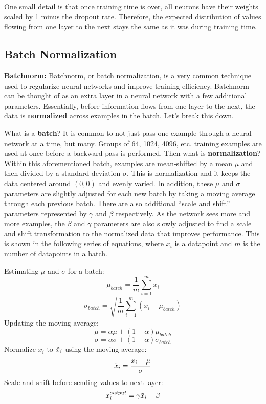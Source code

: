 \begin{flushleft}
    One small detail is that once training time is over, all neurons have their weights scaled by 1 minus the dropout rate. Therefore, the expected distribution of values flowing from one layer to the next stays the same as it was during training time.
\end{flushleft}

\subsection{Batch Normalization}
\begin{flushleft}
    \large \textbf{Batchnorm:} Batchnorm, or batch normalization, is a very common technique used to regularize neural networks and improve training efficiency. Batchnorm can be thought of as an extra layer in a neural network with a few additional parameters. Essentially, before information flows from one layer to the next, the data is \textbf{normalized} across examples in the batch. Let's break this down. \break
    
    What is a \textbf{batch}? It is common to not just pass one example through a neural network at a time, but many. Groups of 64, 1024, 4096, etc. training examples are used at once before a backward pass is performed. Then what is \textbf{normalization}? Within this aforementioned batch, examples are mean-shifted by a mean $\mu$ and then divided by a standard deviation $\sigma$. This is normalization and it keeps the data centered around $(0,0)$ and evenly varied. In addition, these $\mu$ and $\sigma$ parameters are slightly adjusted for each new batch by taking a moving average through each previous batch. There are also additional ``scale and shift'' parameters represented by $\gamma$ and $\beta$ respectively. As the network sees more and more examples, the $\beta$ and $\gamma$ parameters are also slowly adjusted to find a scale and shift transformation to the normalized data that improves performance. This is shown in the following series of equations, where $x_i$ is a datapoint and $m$ is the number of datapoints in a batch. \break

    Estimating $\mu$ and $\sigma$ for a batch:
    $$\mu_{batch} = \frac{1}{m}\sum_{i=1}^m x_i$$
    $$\sigma_{batch} = \sqrt{\frac{1}{m}\sum_{i=1}^m (x_i - \mu_{batch})}$$
    Updating the moving average:
    $$\mu = \alpha \mu + (1-\alpha)\mu_{batch}$$
    $$\sigma = \alpha \sigma + (1-\alpha)\sigma_{batch}$$
    Normalize $x_i$ to $\Tilde{x}_i$ using the moving average:
    $$\Tilde{x}_i = \frac{x_i - \mu}{\sigma}$$
    Scale and shift before sending values to next layer:
    $$x_i^{output} = \gamma\Tilde{x}_i + \beta$$
    

\end{flushleft}
